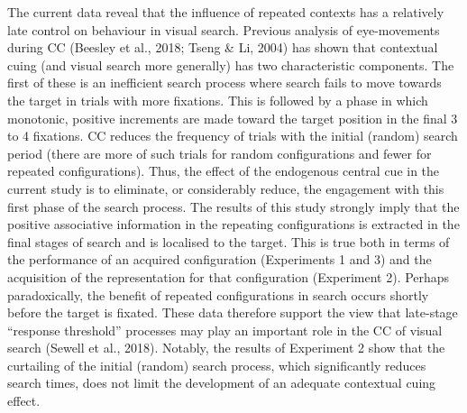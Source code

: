\documentclass[
  man,
  floatsintext,
  longtable,
  nolmodern,
  notxfonts,
  notimes,
  colorlinks=true,linkcolor=blue,citecolor=blue,urlcolor=blue]{apa7}
\begin{document}
The current data reveal that the influence of repeated contexts has a
relatively late control on behaviour in visual search. Previous analysis
of eye-movements during CC (Beesley et al., 2018; Tseng \& Li, 2004) has
shown that contextual cuing (and visual search more generally) has two
characteristic components. The first of these is an inefficient search
process where search fails to move towards the target in trials with
more fixations. This is followed by a phase in which monotonic, positive
increments are made toward the target position in the final 3 to 4
fixations. CC reduces the frequency of trials with the initial (random)
search period (there are more of such trials for random configurations
and fewer for repeated configurations). Thus, the effect of the
endogenous central cue in the current study is to eliminate, or
considerably reduce, the engagement with this first phase of the search
process. The results of this study strongly imply that the positive
associative information in the repeating configurations is extracted in
the final stages of search and is localised to the target. This is true
both in terms of the performance of an acquired configuration
(Experiments 1 and 3) and the acquisition of the representation for that
configuration (Experiment 2). Perhaps paradoxically, the benefit of
repeated configurations in search occurs shortly before the target is
fixated. These data therefore support the view that late-stage
``response threshold'' processes may play an important role in the CC of
visual search (Sewell et al., 2018). Notably, the results of Experiment
2 show that the curtailing of the initial (random) search process, which
significantly reduces search times, does not limit the development of an
adequate contextual cuing effect.

\newpage

\newpage
\end{document}
